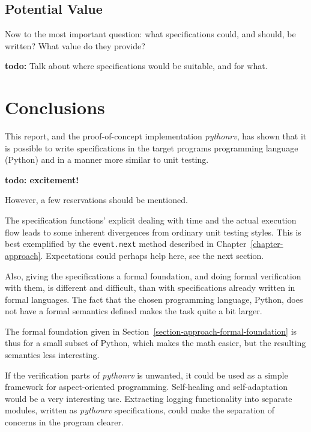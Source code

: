 \documentclass[a4paper,11pt]{kth-mag}
\newcommand{\todo}[1]{\textbf{todo: #1}}
\begin{document}
\section{Potential Value}

Now to the most important question: what specifications could, and should, be
written? What value do they provide?

\todo{}
Talk about where specifications would be suitable, and for what.





\pagestyle{newchap}
\chapter{Conclusions} \label{chapter-conclusions}

This report, and the proof-of-concept implementation \textit{pythonrv}, has
shown that it is possible to write specifications in the target programs
programming language (Python) and in a manner more similar to unit testing.

\todo{excitement!}

However, a few reservations should be mentioned.

The specification functions' explicit dealing with time and the actual
execution flow leads to some inherent divergences from ordinary unit testing
styles. This is best exemplified by the \texttt{event.next} method described in
Chapter~\ref{chapter-approach}. Expectations could perhaps help here, see the
next section.

Also, giving the specifications a formal foundation, and doing formal
verification with them, is different and difficult, than with specifications
already written in formal languages. The fact that the chosen programming
language, Python, does not have a formal semantics defined makes the task quite
a bit larger.

The formal foundation given in Section~\ref{section-approach-formal-foundation}
is thus for a small subset of Python, which makes the math easier, but the
resulting semantics less interesting.

If the verification parts of \textit{pythonrv} is unwanted, it could be used as
a simple framework for aspect-oriented programming. Self-healing and
self-adaptation would be a very interesting use. Extracting logging
functionality into separate modules, written as \textit{pythonrv}
specifications, could make the separation of concerns in the program clearer.
\end{document}
